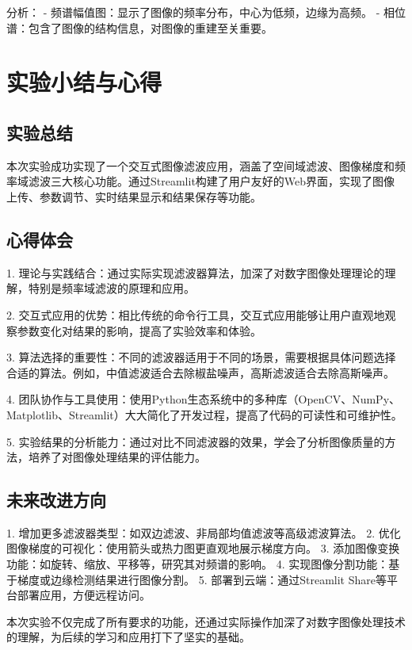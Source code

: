 \documentclass[12pt]{article}
\begin{document}
分析：
- 频谱幅值图：显示了图像的频率分布，中心为低频，边缘为高频。
- 相位谱：包含了图像的结构信息，对图像的重建至关重要。

\section{实验小结与心得}

\subsection{实验总结}

本次实验成功实现了一个交互式图像滤波应用，涵盖了空间域滤波、图像梯度和频率域滤波三大核心功能。通过Streamlit构建了用户友好的Web界面，实现了图像上传、参数调节、实时结果显示和结果保存等功能。

\subsection{心得体会}

1. 理论与实践结合：通过实际实现滤波器算法，加深了对数字图像处理理论的理解，特别是频率域滤波的原理和应用。

2. 交互式应用的优势：相比传统的命令行工具，交互式应用能够让用户直观地观察参数变化对结果的影响，提高了实验效率和体验。

3. 算法选择的重要性：不同的滤波器适用于不同的场景，需要根据具体问题选择合适的算法。例如，中值滤波适合去除椒盐噪声，高斯滤波适合去除高斯噪声。

4. 团队协作与工具使用：使用Python生态系统中的多种库（OpenCV、NumPy、Matplotlib、Streamlit）大大简化了开发过程，提高了代码的可读性和可维护性。

5. 实验结果的分析能力：通过对比不同滤波器的效果，学会了分析图像质量的方法，培养了对图像处理结果的评估能力。

\subsection{未来改进方向}

1. 增加更多滤波器类型：如双边滤波、非局部均值滤波等高级滤波算法。
2. 优化图像梯度的可视化：使用箭头或热力图更直观地展示梯度方向。
3. 添加图像变换功能：如旋转、缩放、平移等，研究其对频谱的影响。
4. 实现图像分割功能：基于梯度或边缘检测结果进行图像分割。
5. 部署到云端：通过Streamlit Share等平台部署应用，方便远程访问。

本次实验不仅完成了所有要求的功能，还通过实际操作加深了对数字图像处理技术的理解，为后续的学习和应用打下了坚实的基础。
\end{document}
